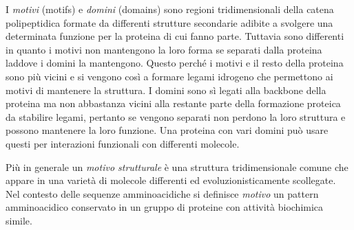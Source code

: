 {\par I \textit{motivi} (motifs) e \textit{domini} (domains) sono regioni tridimensionali della catena polipeptidica formate da differenti strutture secondarie adibite a svolgere una determinata funzione per la proteina di cui fanno parte. Tuttavia sono differenti in quanto i motivi non mantengono la loro forma se separati dalla proteina laddove i domini la mantengono. Questo perché i motivi e il resto della proteina sono più vicini e si vengono così a formare legami idrogeno che permettono ai motivi di mantenere la struttura. I domini sono sì legati alla backbone della proteina ma non abbastanza vicini alla restante parte della formazione proteica da stabilire legami, pertanto se vengono separati non perdono la loro struttura e possono mantenere la loro funzione. Una proteina con vari domini può usare questi per interazioni funzionali con differenti molecole.

\par Più in generale un \textit{motivo strutturale} è una struttura tridimensionale comune che appare in una varietà di molecole differenti ed evoluzionisticamente scollegate. Nel contesto delle sequenze amminoacidiche si definisce \textit{motivo} un pattern amminoacidico conservato in un gruppo di proteine con attività biochimica simile.

}
